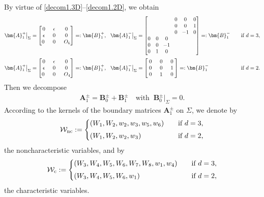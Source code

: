 \documentclass[twoside,11pt]{article}
\numberwithin{equation}{section}
\newcommand\w[1]{\makebox[1em]{$#1$}}
\begin{document}
By virtue of \eqref{decom1.3D}--\eqref{decom1.2D}, we obtain
	\begin{alignat}{3}
		\label{decom2.3D}
&		\bm{A}_1^+\big|_{\Sigma}=
		\begin{bmatrix}
			0 & \epsilon&0 \\
			\epsilon& 0 & 0\\
			0 \;&\; 0 \;&\; O_6
		\end{bmatrix}	=:{\bm{B}}_1^{+},\   \
		\bm{A}_1^-\big|_{\Sigma}=
		\begin{bmatrix}
			&  &  & 0 &0&0 \\
			& & &0&0&1\\
			& &  &0&\w{-1}&0\\
			0 &0&0  &  & &\\
			0&0&\w{-1} & & & \\
			0&1&0&&&
		\end{bmatrix}	=:{\bm{B}}_1^{-}
\ \ \	&&	\textrm{if }d=3,\\[1mm]
		\label{decom2.2D}
&		\bm{A}_1^+\big|_{\Sigma}=
\begin{bmatrix}
	0 & \epsilon&0 \\
	\epsilon& 0 & 0\\
	0 \;&\; 0 \;&\; O_4
\end{bmatrix}	=:{\bm{B}}_1^{+},\ \
\bm{A}_1^-\big|_{\Sigma}=
	\begin{bmatrix}
	0 & 0&0 \\
	0& 0 & 1\\
	\w{0} & \w{1} & \w{0}
\end{bmatrix}	=:{\bm{B}}_1^{-}
\ &&	\textrm{if }d=2.
\end{alignat}
Then we decompose
\begin{align}
	{\bm{A}}_1^{\pm}={\bm{B}}_{0}^{\pm}+{\bm{B}}_1^{\pm}
	\quad \textrm{with } \ {\bm{B}}_{0}^{\pm}|_{\Sigma}=0.
	\label{decom3}
\end{align}
According to the kernels of the boundary matrices $\bm{A}_1^{\pm}$ on ${\Sigma}$, we denote by
	\begin{alignat}{5}
		\label{W.nc:def}		
	\mathcal{W}_{\rm nc}:=
\left\{
\begin{aligned}
	&(W_1,W_2,w_2,w_3,w_5,w_6)\quad &&\textrm{if }d=3,\\[1mm]
	&(W_1,W_2,w_2,w_3)\quad &&\textrm{if }d=2,
\end{aligned}
\right.
	\end{alignat}
the noncharacteristic variables,
and by
	\begin{alignat}{5}
	\label{W.c:def}		
	\mathcal{W}_{\rm c}:=
	\left\{
	\begin{aligned}
		&(W_3,W_4,W_5,W_6,W_7,W_8,w_1,w_4)\quad &&\textrm{if }d=3,\\[1mm]
		&(W_3,W_4,W_5,W_6,w_1)\quad &&\textrm{if }d=2,
	\end{aligned}
	\right.
\end{alignat}	
the characteristic variables.
\end{document}
